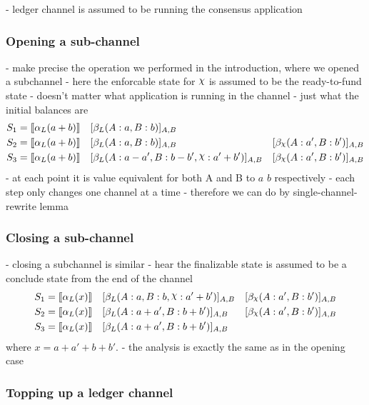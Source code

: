 \documentclass{article}
\DeclareRobustCommand{\rchi}{{\mathpalette\irchi\relax}}
\newcommand{\irchi}[2]{\raisebox{\depth}{$#1\chi$}} %
\theoremstyle{definition}
\newcommand{\adj}[1]{\llbracket #1 \rrbracket}
\newcommand{\enf}[1]{[#1]}
\begin{document}
- ledger channel is assumed to be running the consensus application

\subsubsection{Opening a sub-channel}

- make precise the operation we performed in the introduction, where we opened a subchannel
- here the enforcable state for $\rchi$ is assumed to be the ready-to-fund state
- doesn't matter what application is running in the channel - just what the initial balances are
\begin{align*}
  S_1 &= \adj{\alpha_L(a+b)} &&\enf{\beta_L(A: a, B: b)}_{A, B} & \\
  S_2 &= \adj{\alpha_L(a+b)} &&\enf{\beta_L(A: a, B: b)}_{A, B}&\enf{\beta_\rchi(A: a', B: b')}_{A, B} \\
  S_3 &= \adj{\alpha_L(a+b)} &&\enf{\beta_L(A: a-a', B: b-b', \rchi: a' + b')}_{A, B}&\enf{\beta_\rchi(A: a', B: b')}_{A, B}
\end{align*}
- at each point it is value equivalent for both A and B to $a$ $b$ respectively
- each step only changes one channel at a time 
- therefore we can do by single-channel-rewrite lemma

\subsubsection{Closing a sub-channel}

- closing a subchannel is similar
- hear the finalizable state is assumed to be a conclude state from the end of the channel
\begin{align*}
S_1 &= \adj{\alpha_L(x)} &&\enf{\beta_L(A: a, B: b, \rchi: a' + b')}_{A, B}&\enf{\beta_\rchi(A: a', B: b')}_{A, B}\\
S_2 &= \adj{\alpha_L(x)} &&\enf{\beta_L(A: a + a', B: b + b')}_{A, B}&\enf{\beta_\rchi(A: a', B: b')}_{A, B} \\
S_3 &= \adj{\alpha_L(x)} &&\enf{\beta_L(A: a + a', B: b + b')}_{A, B} & 
\end{align*}
where $x = a + a' + b + b'$.
- the analysis is exactly the same as in the opening case

\subsubsection{Topping up a ledger channel}
\end{document}
